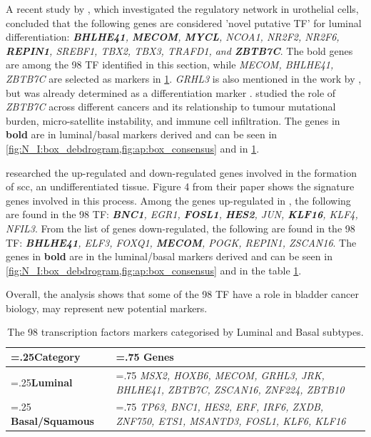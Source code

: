 A recent study by \citet{Ramal2024-ha}, which investigated the regulatory network in urothelial cells, concluded that the following genes are considered 'novel putative TF' for luminal differentiation: \textit{\textbf{BHLHE41}, \textbf{MECOM}, \textbf{MYCL}, NCOA1, NR2F2, NR2F6, \textbf{REPIN1}, SREBF1, TBX2, TBX3, TRAFD1, and \textbf{ZBTB7C}}. The bold genes are among the 98 TF identified in this section, while \textit{MECOM, BHLHE41, ZBTB7C} are selected as markers in \cref{tab:N_I:genes_lum_basal}. \textit{GRHL3} is also mentioned in the work by \citet{Ramal2024-ha}, but was already determined as a differentiation marker \citep{Bock2014-zy}. \citet{Chen2021-tc} studied the role of \textit{ZBTB7C} across different cancers and its relationship to tumour mutational burden, micro-satellite instability, and immune cell infiltration. The genes in \textbf{bold} are in luminal/basal markers derived and can be seen in \cref{fig:N_I:box_debdrogram,fig:ap:box_consensus} and in \cref{tab:N_I:genes_lum_basal}.

\citet{Hurst2022-sp} researched the up-regulated and down-regulated genes involved in the formation of \acrfull{scc}, an undifferentiated tissue. Figure 4 from their paper shows the signature genes involved in this process. Among the genes up-regulated in \citet{Hurst2022-sp}, the following are found in the 98 TF: \textit{\textbf{BNC1}, EGR1, \textbf{FOSL1}, \textbf{HES2}, JUN, \textbf{KLF16}, KLF4, NFIL3}. From the list of genes down-regulated, the following are found in the 98 TF: \textit{\textbf{BHLHE41}, ELF3, FOXQ1, \textbf{MECOM}, POGK, REPIN1, ZSCAN16}. The genes in \textbf{bold} are in the luminal/basal markers derived and can be seen in \cref{fig:N_I:box_debdrogram,fig:ap:box_consensus} and in the table \cref{tab:N_I:genes_lum_basal}.

% 
Overall, the analysis shows that some of the 98 TF have a role in bladder cancer biology, may represent new potential markers.

\begin{table}[!htb]
  \centering
  \small
  \begin{tabularx}{\textwidth}{>{\hsize=.25\hsize}X|>{\hsize=.75\hsize}X}
    \toprule
    \textbf{Category} & \textbf{Genes} \\
    \midrule
    \textbf{Luminal} & \textit{MSX2, HOXB6, MECOM, GRHL3, JRK, BHLHE41, ZBTB7C, ZSCAN16, ZNF224, ZBTB10} \\
    \midrule
    \textbf{Basal/Squamous} & \textit{TP63, BNC1, HES2, ERF, IRF6, ZXDB, ZNF750, ETS1, MSANTD3, FOSL1, KLF6, KLF16} \\
    \bottomrule
  \end{tabularx}
  \caption[Luminal and Basal markers from the 98 TF]{The 98 transcription factors markers categorised by Luminal and Basal subtypes.} %
  \label{tab:N_I:genes_lum_basal}
\end{table}


